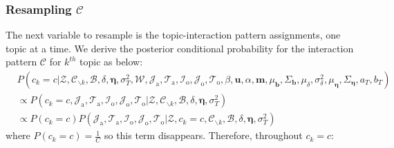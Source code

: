       \subsubsection{Resampling $\mathcal{C}$} \label{subsec: Resampling C}
   The next variable to resample is the topic-interaction pattern assignments, one topic at a time. We derive the posterior conditional probability for the interaction pattern $\mathcal{C}$ for $k^{th}$ topic as below:
   \begin{equation}
   \begin{aligned} & P(c_k=c|\mathcal{Z},   \mathcal{C}_{\backslash k},   \mathcal{B},\delta,\boldsymbol{\eta}, \sigma_T^2,  \mathcal{W}, \mathcal{J}_{\mbox{a}}, \mathcal{T}_{\mbox{a}},\mathcal{I}_{\mbox{o}}, \mathcal{J}_{\mbox{o}}, \mathcal{T}_{\mbox{o}}, \beta, \boldsymbol{u}, \alpha, \boldsymbol{m},  \mu_{\boldsymbol{b}}, \Sigma_{\boldsymbol{b}}, \mu_\delta, \sigma^2_\delta,  \mu_{\boldsymbol{\eta}}, \Sigma_{\boldsymbol{\eta}}, a_T, b_T)\\
   &\propto P(c_k=c, \mathcal{J}_{\mbox{a}}, \mathcal{T}_{\mbox{a}},\mathcal{I}_{\mbox{o}}, \mathcal{J}_{\mbox{o}}, \mathcal{T}_{\mbox{o}}|\mathcal{Z}, \mathcal{C}_{\backslash k},   \mathcal{B},\delta, \boldsymbol{\eta}, \sigma_T^2 )\\
   & \propto P(c_k=c)P(\mathcal{J}_{\mbox{a}},\mathcal{T}_{\mbox{a}}, \mathcal{I}_{\mbox{o}}, \mathcal{J}_{\mbox{o}}, \mathcal{T}_{\mbox{o}}| \mathcal{Z}, c_k=c, \mathcal{C}_{\backslash k}, \mathcal{B}, \delta, \boldsymbol{\eta}, \sigma_T^2)
   \end{aligned}
   \end{equation}
   where $P(c_k=c) = \frac{1}{C}$ so this term disappears. Therefore, throughout $c_k=c$:
